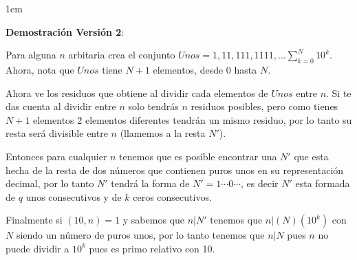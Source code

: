 \documentclass[12pt, fleqn]{article}                             %
\newenvironment{SmallIndentation}[1][0.75em]                    %
    {\begin{adjustwidth}{#1}{}\begin{footnotesize}}                 %
    {\end{footnotesize}\end{adjustwidth}}                           %
\begin{document}
    \clearpage
    \begin{SmallIndentation}[1em]
        \textbf{Demostración Versión 2}:
        
        Para alguna $n$ arbitaria crea el conjunto $Unos = {1, 11, 111, 1111, \dots \sum_{k=0}^{N}10^k }$.
        Ahora, nota que $Unos$ tiene $N+1$ elementos, desde $0$ hasta $N$.

        Ahora ve los residuos que obtiene al dividir cada elementos de $Unos$ entre $n$. Si te das cuenta
        al dividir entre $n$ solo tendrás $n$ residuos posibles, pero como tienes $N+1$ elementos 2 elementos
        diferentes tendrán un mismo residuo, por lo tanto su resta será divisible entre $n$ (llamemos a la resta
        $N'$).

        Entonces para cualquier $n$ tenemos que es posible encontrar una $N'$ que esta hecha de la resta de dos
        números que contienen puros unos en su representación decimal, por lo tanto $N'$ tendrá la forma de
        $N' = 1\cdots0\cdots$, es decir $N'$ esta formada de $q$ unos consecutivos y de $k$ ceros consecutivos.

        Finalmente si $(10, n) =1$ y sabemos que $n|N'$ tenemos que $n|(N)(10^k)$ con $N$ siendo un número de puros
        unos, por lo tanto tenemos que $n|N$ pues $n$ no puede dividir a $10^k$ pues es primo relativo con 10.

    \end{SmallIndentation}
        
\end{document}
